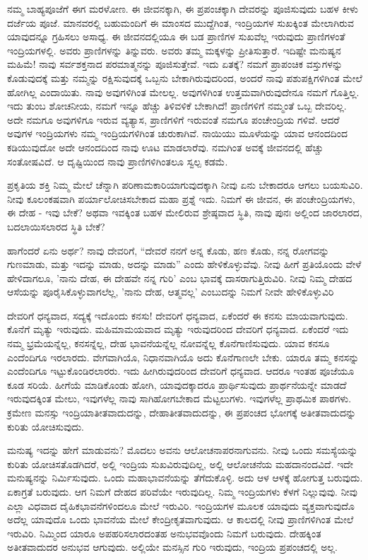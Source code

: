 ನಮ್ಮ ಬಾಹ್ಯಪೂಜೆಗೆ ಈಗ ಮರಳೋಣ. ಈ ಜೀವನಕ್ಕಾಗಿ, ಈ ಪ್ರಪಂಚಕ್ಕಾಗಿ ದೇವರನ್ನು ಪೂಜಿಸುವುದು ಬಹಳ ಕೀಳು ದರ್ಜೆಯ ಪೂಜೆ. ಮಾನವರಲ್ಲಿ ಬಹುಮಂದಿಗೆ ಈ ಮಾಂಸದ ಮುದ್ದೆಗಿಂತ, ಇಂದ್ರಿಯಗಳ ಸುಖಕ್ಕಿಂತ ಮೇಲಾಗಿರುವ ಯಾವುದನ್ನೂ ಗ್ರಹಿಸಲು ಅಸಾಧ್ಯ. ಈ ಜೀವನದಲ್ಲಿಯೂ ಈ ಬಡ ಪ್ರಾಣಿಗಳ ಸುಖವೆಲ್ಲ ಇರುವುದು ಪ್ರಾಣಿಗಳಂತೆ ಇಂದ್ರಿಯಗಳಲ್ಲಿ. ಅವರು ಪ್ರಾಣಿಗಳನ್ನು ತಿನ್ನುವರು. ಅವರು ತಮ್ಮ ಮಕ್ಕಳನ್ನು ಪ್ರೀತಿಸುತ್ತಾರೆ. ಇದಿಷ್ಟೇ ಮನುಷ್ಯನ ಮಹಿಮೆ! ನಾವು ಸರ್ವಶಕ್ತನಾದ ಪರಮಾತ್ಮನನ್ನು ಪೂಜಿಸುತ್ತೇವೆ. ಇದು ಏತಕ್ಕೆ? ನಮಗೆ ಪ್ರಾಪಂಚಿಕ ವಸ್ತುಗಳನ್ನು ಕೊಡುವುದಕ್ಕೆ ಮತ್ತು ನಮ್ಮನ್ನು ರಕ್ಷಿಸುವುದಕ್ಕೆ ಒಬ್ಬನು ಬೇಕಾಗಿರುವುದರಿಂದ, ಅಂದರೆ ನಾವು ಪಶುಪಕ್ಷಿಗಳಿಗಿಂತ ಮೇಲೆ ಹೋಗಿಲ್ಲ ಎಂದಾಯಿತು. ನಾವು ಅವುಗಳಿಗಿಂತ ಮೇಲಲ್ಲ. ಅವುಗಳಿಗಿಂತ ಉತ್ತಮವಾಗಿರುವುದೇನೂ ನಮಗೆ ಗೊತ್ತಿಲ್ಲ. ಇದು ತುಂಬ ಶೋಚನೀಯ, ನಮಗೆ ಇನ್ನೂ ಹೆಚ್ಚು ತಿಳಿವಳಿಕೆ ಬೇಕಾಗಿದೆ! ಪ್ರಾಣಿಗಳಿಗೆ ನಮ್ಮಂತೆ ಒಬ್ಬ ದೇವರಿಲ್ಲ. ಅದೇ ನಮಗೂ ಅವುಗಳಿಗೂ ಇರುವ ವ್ಯತ್ಯಾಸ, ಪ್ರಾಣಿಗಳಿಗೆ ಇರುವಂತೆ ನಮಗೂ ಪಂಚೇಂದ್ರಿಯ ಗಳಿವೆ. ಆದರೆ ಅವುಗಳ ಇಂದ್ರಿಯಗಳು ನಮ್ಮ ಇಂದ್ರಿಯಗಳಿಗಿಂತ ಚುರುಕಾಗಿವೆ. ನಾಯಿಯು ಮೂಳೆಯನ್ನು ಯಾವ ಆನಂದದಿಂದ ಕಡಿಯುವುದೋ ಅದೇ ಆನಂದದಿಂದ ನಾವು ಊಟ ಮಾಡಲಾರೆವು. ನಮಗಿಂತ ಅವಕ್ಕೆ ಜೀವನದಲ್ಲಿ ಹೆಚ್ಚು ಸಂತೋಷವಿದೆ. ಆ ದೃಷ್ಟಿಯಿಂದ ನಾವು ಪ್ರಾಣಿಗಳಿಗಿಂತಲೂ ಸ್ವಲ್ಪ ಕಡಮೆ.

ಪ್ರಕೃತಿಯ ಶಕ್ತಿ ನಿಮ್ಮ ಮೇಲೆ ಚೆನ್ನಾಗಿ ಪರಿಣಾಮಕಾರಿಯಾಗುವುದಕ್ಕಾಗಿ ನೀವು ಏನು ಬೇಕಾದರೂ ಆಗಲು ಬಯಸುವಿರಿ. ನೀವು ಕೂಲಂಕಷವಾಗಿ ಪರ್ಯಾಲೋಚಿಸಬೇಕಾದ ಮಹಾ ಪ್ರಶ್ನೆ ಇದು. ನಿಮಗೆ ಈ ಜೀವನ, ಈ ಪಂಚೇಂದ್ರಿಯಗಳು, ಈ ದೇಹ - ಇವು ಬೇಕೆ? ಅಥವಾ ಇವಕ್ಕಿಂತ ಬಹಳ ಮೇಲಿರುವ ಶ್ರೇಷ್ಠವಾದ ಸ್ಥಿತಿ, ನಾವು ಪುನಃ ಅಲ್ಲಿಂದ ಜಾರಲಾರದ, ಬದಲಾಯಿಸಲಾರದ ಸ್ಥಿತಿ ಬೇಕೆ?

ಹಾಗೆಂದರೆ ಏನು ಅರ್ಥ? ನಾವು ದೇವರಿಗೆ, “ದೇವರೆ ನನಗೆ ಅನ್ನ ಕೊಡು, ಹಣ ಕೊಡು, ನನ್ನ ರೋಗವನ್ನು ಗುಣಮಾಡು, ಮತ್ತು ಇದನ್ನು ಮಾಡು, ಅದನ್ನು ಮಾಡು” ಎಂದು ಹೇಳಿಕೊಳ್ಳುವೆವು. ನೀವು ಹೀಗೆ ಪ್ರತಿಯೊಂದು ವೇಳೆ ಹೇಳಿದಾಗಲೂ, 'ನಾನು ದೇಹ, ಈ ದೇಹವೇ ನನ್ನ ಗುರಿ' ಎಂಬ ಭಾವಕ್ಕೆ ದಾಸರಾಗುತ್ತಿರುವಿರಿ. ನೀವು ನಿಮ್ಮ ದೇಹದ ಆಸೆಯನ್ನು ಪೂರೈಸಿಕೊಳ್ಳುವಾಗಲೆಲ್ಲ, 'ನಾನು ದೇಹ, ಆತ್ಮವಲ್ಲ' ಎಂಬುದನ್ನು ನಿಮಗೆ ನೀವೇ ಹೇಳಿಕೊಳ್ಳುವಿರಿ

ದೇವರಿಗೆ ಧನ್ಯವಾದ, ಸದ್ಯಕ್ಕೆ ಇದೊಂದು ಕನಸು! ದೇವರಿಗೆ ಧನ್ಯವಾದ, ಏಕೆಂದರೆ ಈ ಕನಸು ಮಾಯವಾಗುವುದು. ಕೊನೆಗೆ ಮೃತ್ಯು ಇರುವುದು. ಮಹಿಮಾಮಯವಾದ ಮೃತ್ಯು ಇರುವುದರಿಂದ ದೇವರಿಗೆ ಧನ್ಯವಾದ. ಏಕೆಂದರೆ ಇದು ನಮ್ಮ ಭ್ರಮೆಯನ್ನೆಲ್ಲ, ಕನಸನ್ನೆಲ್ಲ, ದೇಹ ಭಾವನೆಯನ್ನೆಲ್ಲ ನೋವನ್ನೆಲ್ಲ ಕೊನೆಗಾಣಿಸುವುದು. ಯಾವ ಕನಸೂ ಎಂದೆಂದಿಗೂ ಇರಲಾರದು. ವೇಗವಾಗಿಯೊ, ನಿಧಾನವಾಗಿಯೊ ಅದು ಕೊನೆಗಾಣಲೇ ಬೇಕು. ಯಾರೂ ತಮ್ಮ ಕನಸನ್ನು ಎಂದೆಂದಿಗೂ ಇಟ್ಟುಕೊಂಡಿರಲಾರರು. ಇದು ಹೀಗಿರುವುದರಿಂದ ದೇವರಿಗೆ ಧನ್ಯವಾದ. ಆದರೂ ಇಂತಹ ಪೂಜೆಯೂ ಕೂಡ ಸರಿಯೆ. ಹೀಗೆಯೆ ಮಾಡಿಕೊಂಡು ಹೋಗಿ, ಯಾವುದಕ್ಕಾದರೂ ಪ್ರಾರ್ಥಿಸುವುದು ಪ್ರಾರ್ಥನೆಯನ್ನೇ ಮಾಡದೆ ಇರುವುದಕ್ಕಿಂತ ಮೇಲು, ಇವುಗಳೆಲ್ಲ ನಾವು ಸಾಗಿಹೋಗಬೇಕಾದ ಮೆಟ್ಟಲುಗಳು. ಇವುಗಳೆಲ್ಲ ಪ್ರಾಥಮಿಕ ಪಾಠಗಳು. ಕ್ರಮೇಣ ಮನಸ್ಸು ಇಂದ್ರಿಯಾತೀತವಾದುದನ್ನು, ದೇಹಾತೀತವಾದುದನ್ನು, ಈ ಪ್ರಪಂಚದ ಭೋಗಕ್ಕೆ ಅತೀತವಾದುದನ್ನು ಕುರಿತು ಯೋಚಿಸುವುದು.

ಮನುಷ್ಯ ಇದನ್ನು ಹೇಗೆ ಮಾಡುವನು? ಮೊದಲು ಅವನು ಆಲೋಚನಾಪರನಾಗುವನು. ನೀವು ಒಂದು ಸಮಸ್ಯೆಯನ್ನು ಕುರಿತು ಯೋಚಿಸತೊಡಗಿದರೆ, ಅಲ್ಲಿ ಇಂದ್ರಿಯ ಸುಖವಿರುವುದಿಲ್ಲ, ಅಲ್ಲಿ ಆಲೋಚನೆಯ ಮಹದಾನಂದವಿದೆ. ಇದೇ ಮನುಷ್ಯನನ್ನು ನಿರ್ಮಿಸುವುದು. ಒಂದು ಮಹಾಭಾವನೆಯನ್ನು ತೆಗೆದುಕೊಳ್ಳಿ. ಅದು ಆಳ ಆಳಕ್ಕೆ ಹೋಗುತ್ತ ಬರುವುದು. ಏಕಾಗ್ರತೆ ಬರುವುದು. ಆಗ ನಿಮಗೆ ದೇಹದ ಪರಿವೆಯೇ ಇರುವುದಿಲ್ಲ. ನಿಮ್ಮ ಇಂದ್ರಿಯಗಳು ಕೆಳಗೆ ನಿಲ್ಲುವುವು. ನೀವು ಎಲ್ಲಾ ವಿಧವಾದ ದೈಹಿಕಭಾವನೆಗಳಿಂದಲೂ ಮೇಲೆ ಇರುವಿರಿ. ಇಂದ್ರಿಯಗಳ ಮೂಲಕ ಯಾವುದು ವ್ಯಕ್ತವಾಗುವುದೊ ಅದೆಲ್ಲ ಯಾವುದೊ ಒಂದು ಭಾವನೆಯ ಮೇಲೆ ಕೇಂದ್ರೀಕೃತವಾಗುವುದು. ಆ ಕಾಲದಲ್ಲಿ ನೀವು ಪ್ರಾಣಿಗಳಿಗಿಂತ ಮೇಲೆ ಇರುವಿರಿ. ನಿಮ್ಮಿಂದ ಯಾರೂ ಅಪಹರಿಸಲಾರದಂತಹ ಅನುಭವವೊಂದು ನಿಮಗೆ ಬರುವುದು. ದೇಹಕ್ಕಿಂತ ಅತೀತವಾದುದರ ಅನುಭವ ಆಗುವುದು. ಅಲ್ಲಿಯೇ ಮನಸ್ಸಿನ ಗುರಿ ಇರುವುದು, ಇಂದ್ರಿಯ ಪ್ರಪಂಚದಲ್ಲಿ ಅಲ್ಲ.

